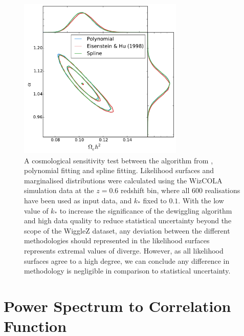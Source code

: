 \documentclass[titlesmallcaps, examinerscopy, copyrightpage]{uqthesis}
\begin{document}
\begin{appendices}
\begin{figure}[h!]
  \begin{center}
    \includegraphics[width=0.7\textwidth]{images/AcosmologyTest.pdf}
  \end{center}
  \caption{A cosmological sensitivity test between the algorithm from \citet{EisensteinHu1998}, polynomial fitting and spline fitting. Likelihood surfaces and marginalised distributions were calculated using the WizCOLA simulation data at the $z=0.6$ redshift bin, where all 600 realisations have been used as input data, and $k_*$ fixed to $0.1$. With the low value of $k_*$ to increase the significance of the dewiggling algorithm and high data quality to reduce statistical uncertainty beyond the scope of the WiggleZ dataset, any deviation between the different methodologies should represented in the likelihood surfaces represents extremal values of diverge. However, as all likelihood surfaces agree to a high degree, we can conclude any difference in methodology is negligible in comparison to statistical uncertainty.}
  \label{fig:AcosmologyTest}
\end{figure}










\chapter{Power Spectrum to Correlation Function} \label{app:pk2xi}


\end{appendices}
\end{document}
